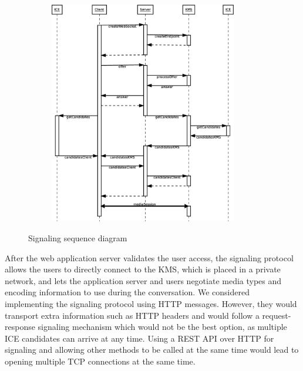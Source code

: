 \begin{figure}
    \centering
    \begin{subfigure}{}
    	\includegraphics[width=0.9\textwidth]{figures/signaling}
    \end{subfigure}
    \caption{Signaling sequence diagram}
    \label{fig:signaling2}
\end{figure} 





After the web application server validates the user access, the signaling protocol allows the users to directly connect to the \ac{KMS}, which is placed in a private network, and lets the application server and users negotiate media types and encoding information to use during the conversation.
We considered implementing the signaling protocol using \ac{HTTP} messages.
However, they would transport extra information such as \ac{HTTP} headers and would follow a request-response signaling mechanism which would not be the best option, as multiple ICE candidates can arrive at any time. Using a \ac{REST} \ac{API} over \ac{HTTP} for signaling and allowing other methods to be called at the same time would lead to opening multiple \ac{TCP} connections at the same time.

